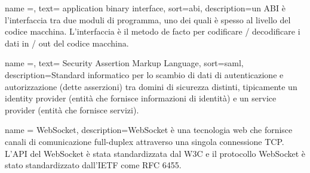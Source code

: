 {
    name =,
    text= application binary interface,
    sort=abi,
    description={un ABI è l'interfaccia tra due moduli di programma, uno dei quali è spesso al livello del codice macchina. L'interfaccia è il metodo de facto per codificare / decodificare i dati in / out del codice macchina.}
}

{
    name =,
    text= Security Assertion Markup Language,
    sort=saml,
    description={Standard informatico per lo scambio di dati di autenticazione e autorizzazione
    (dette asserzioni) tra domini di sicurezza distinti, tipicamente un identity provider
    (entità che fornisce informazioni di identità) e un service provider (entità che
    fornisce servizi).}
}


{
    name = {WebSocket},
    description={WebSocket è una tecnologia web che fornisce canali di comunicazione full-duplex attraverso una singola connessione TCP. L'API del WebSocket è stata standardizzata dal W3C e il protocollo WebSocket è stato standardizzato dall'IETF come RFC 6455.}
}
